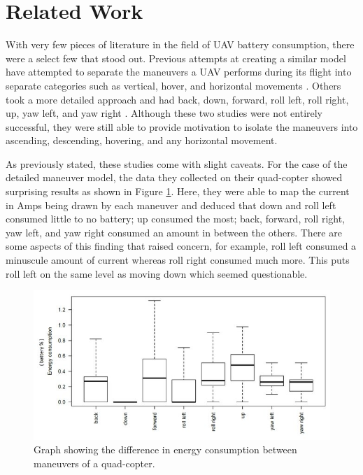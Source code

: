 \documentclass{article}
\begin{document}
\section{Related Work}
With very few pieces of literature in the field of UAV battery consumption, there were a select few that stood out. Previous attempts at creating a similar model have attempted to separate the maneuvers a UAV performs during its flight into separate categories such as vertical, hover, and horizontal movements \cite{Prasetia}. Others took a more detailed approach and had back, down, forward, roll left, roll right, up, yaw left, and yaw right \cite{Corral}. Although these two studies were not entirely successful, they were still able to provide motivation to isolate the maneuvers into ascending, descending, hovering, and any horizontal movement.\par

As previously stated, these studies come with slight caveats. For the case of the detailed maneuver model, the data they collected on their quad-copter showed surprising results as shown in Figure \ref{fig:source2}. Here, they were able to map the current in Amps being drawn by each maneuver and deduced that down and roll left consumed little to no battery; up consumed the most; back, forward, roll right, yaw left, and yaw right consumed an amount in between the others. There are some aspects of this finding that raised concern, for example, roll left consumed a minuscule amount of current whereas roll right consumed much more. This puts roll left on the same level as moving down which seemed questionable. \par

\begin{figure}[!h]
	\centering
	\includegraphics[scale=0.38]{images/source2graph.jpg}
	\caption{Graph showing the difference in energy consumption between maneuvers of a quad-copter.}
	\label{fig:source2}
\end{figure}
\end{document}
